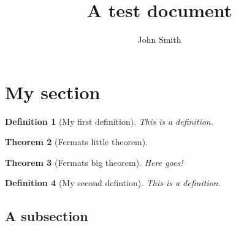 \documentclass[11pt, a4paper]{report} %
\title{A test document}
\author{John Smith}
\theoremstyle{plainspaced}
\newtheorem{theorem}{Theorem}[chapter]			%
\theoremstyle{plainspaced}
\newtheorem{definition}[theorem]{Definition}	%
\theoremstyle{definitionspaced}
\begin{document}
\maketitle

\begin{abstract}

\end{abstract}

\section{My section}

\begin{definition}[My first definition]
	This is a definition.
\end{definition}

\begin{theorem}[Fermats little theorem]
	\label{thm:fermat}
\end{theorem}

\begin{theorem}[Fermats big theorem]
	Here goes!
\end{theorem}

\begin{definition}[My second defintion]
	This is a definition.
\end{definition}

\subsection{A subsection}
\label{subsec:a_subsection}
\end{document}

